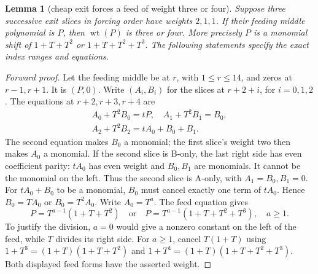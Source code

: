 \documentclass{article}
\newtheorem{lemma}{Lemma}
\DeclareMathOperator{\wt}{wt}
\begin{document}
\begin{lemma}[cheap exit forces a feed of weight three or four]\label{lem:cheap}
  Suppose three successive exit slices in forcing order have weights \(2, 1, 1\). If their
  feeding middle polynomial is \(P\), then \(\wt(P)\) is three or four. More precisely \(P\) is a
  monomial shift of \(1 + T + T^2\) or \(1 + T + T^2 + T^3\). The following statements specify
  the exact index ranges and equations.
\end{lemma}

\begin{proof}[Forward proof]
  Let the feeding middle be at \(r\), with \(1 \le r \le 14\), and zeros at \(r - 1, r + 1\). It
  is \((P, 0)\). Write \((A_i, B_i)\) for the slices at \(r + 2 + i\), for \(i = 0, 1, 2\). The
  equations at \(r + 2, r + 3, r + 4\) are
  \begin{equation}\label{eq:cheap-forward}
    \begin{gathered}
      A_0 + T^2 B_0 = tP, \quad A_1 + T^2 B_1 = B_0, \\
      A_2 + T^2 B_2 = t A_0 + B_0 + B_1.
    \end{gathered}
  \end{equation}
  The second equation makes \(B_0\) a monomial; the first slice's weight two then makes \(A_0\) a
  monomial. If the second slice is B-only, the last right side has even coefficient parity:
  \(t A_0\) has even weight and \(B_0, B_1\) are monomials. It cannot be the monomial on the
  left. Thus the second slice is A-only, with \(A_1 = B_0, B_1 = 0\). For \(t A_0 + B_0\) to be a
  monomial, \(B_0\) must cancel exactly one term of \(t A_0\). Hence \(B_0 = T A_0\) or
  \(B_0 = T^2 A_0\). Write \(A_0 = T^a\). The feed equation gives
  \begin{equation}
    P = T^{a-1} (1 + T + T^2) \quad \text{or} \quad
    P = T^{a-1} (1 + T + T^2 + T^3), \quad a \ge 1.
  \end{equation}
  To justify the division, \(a = 0\) would give a nonzero constant on the left of the feed,
  while \(T\) divides its right side. For \(a \ge 1\), cancel \(T(1 + T)\) using
  \(1 + T^3 = (1 + T)(1 + T + T^2)\) and \(1 + T^4 = (1 + T)(1 + T + T^2 + T^3)\). Both displayed
  feed forms have the asserted weight.


\end{proof}
\end{document}
